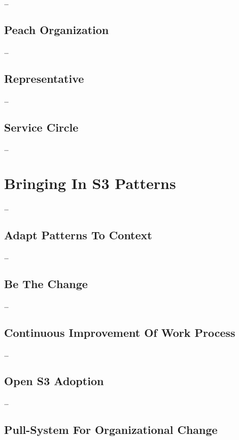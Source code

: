 {\ldots}

\section{Peach Organization}
\label{peachorganization}

{\ldots}

\section{Representative}
\label{representative}

{\ldots}

\section{Service Circle}
\label{servicecircle}

{\ldots}

\chapter{Bringing In S3 Patterns}
\label{bringingins3patterns}

{\ldots}

\section{Adapt Patterns To Context}
\label{adaptpatternstocontext}

{\ldots}

\section{Be The Change}
\label{bethechange}

{\ldots}

\section{Continuous Improvement Of Work Process}
\label{continuousimprovementofworkprocess}

{\ldots}

\section{Open S3 Adoption}
\label{opens3adoption}

{\ldots}

\section{Pull-System For Organizational Change}
\label{pull-systemfororganizationalchange}

